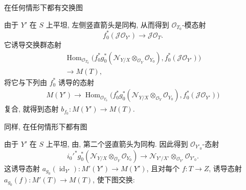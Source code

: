 在任何情形下都有交换图

\begin{center}
\end{center}

由于 \(Y'\) 在 \(S\) 上平坦, 左侧竖直箭头是同构,
从而得到 \(\mathscr O_{T_0}\)-模态射
\[
 f_0^*(\mathscr J\mathscr O_{Y'})\longrightarrow
 \mathscr J\mathscr O_T.
\]
它诱导交换群态射
\begin{multline*}
 \operatorname{Hom}_{\mathscr O_{T_0}}
 \bigl(f_0^*g_0^*(\mathscr N_{Y/X}
  \otimes_{\mathscr O_Y}\mathscr O_{Y_0}),
  f_0^*(\mathscr J\mathscr O_{Y'})\bigr)\\
 \longrightarrow M(T),
\end{multline*}
将它与下列由 \(f_0^*\) 诱导的态射
\begin{multline*}
 M(Y')\longrightarrow
 \operatorname{Hom}_{\mathscr O_{T_0}}
 \bigl(f_0^*g_0^*(\mathscr N_{Y/X}
  \otimes_{\mathscr O_Y}\mathscr O_{Y_0}),
  f_0^*(\mathscr J\mathscr O_{Y'})\bigr)
\end{multline*}
复合, 就得到态射 \(b_{f_0}:M(Y')\to M(T)\).

同样, 在任何情形下都有图

\begin{center}
\end{center}

由于 \(Y'\) 在 \(S\) 上平坦, 由,
第二个竖直箭头为同构. 因此得到 \(\mathscr O_{Y'_0}\)-态射
\[
 i_0'^*g_0^*(\mathscr N_{Y/X}
   \otimes_{\mathscr O_Y}\mathscr O_{Y_0})
 \longrightarrow
 \mathscr N_{Y'/X'}
   \otimes_{\mathscr O_{Y'}}\mathscr O_{Y'_0}.
\]
这诱导态射 \(a_{g_0}(\operatorname{id}_{Y'}):M'(Y')\to M(Y')\),
且对每个 \(f:T\to Z\), 诱导态射 \(a_{g_0}(f):M'(T)\to M(T)\),
使下图交换:

\begin{center}
\end{center}

